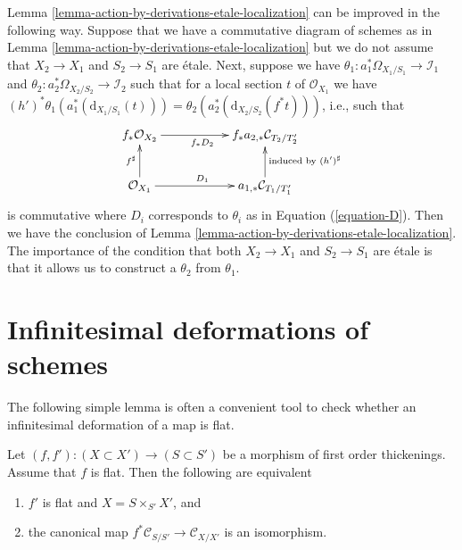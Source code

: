 \begin{remark}
\label{remark-tiny-improvement}
Lemma \ref{lemma-action-by-derivations-etale-localization}
can be improved in the following way.
Suppose that we have a commutative diagram of schemes as in
Lemma \ref{lemma-action-by-derivations-etale-localization}
but we do not assume that $X_2 \to X_1$
and $S_2 \to S_1$ are \'etale. Next, suppose we have
$\theta_1 : a_1^*\Omega_{X_1/S_1} \to \mathcal{I}_1$
and
$\theta_2 : a_2^*\Omega_{X_2/S_2} \to \mathcal{I}_2$
such that for a local section $t$ of $\mathcal{O}_{X_1}$ we have
$(h')^*\theta_1(a_1^*(\text{d}_{X_1/S_1}(t))) =
\theta_2(a_2^*(\text{d}_{X_2/S_2}(f^*t)))$, i.e., such that
$$
\xymatrix{
f_*\mathcal{O}_{X_2} \ar[rr]_{f_*D_2} & &
f_*a_{2, *}\mathcal{C}_{T_2/T_2'} \\
\mathcal{O}_{X_1} \ar[rr]^{D_1} \ar[u]^{f^\sharp} & &
a_{1, *}\mathcal{C}_{T_1/T_1'} \ar[u]_{\text{induced by }(h')^\sharp}
}
$$
is commutative where $D_i$ corresponds to $\theta_i$ as in
Equation (\ref{equation-D}). Then we have the conclusion of
Lemma \ref{lemma-action-by-derivations-etale-localization}.
The importance of the condition that both $X_2 \to X_1$ and
$S_2 \to S_1$ are \'etale is that it allows us to construct a $\theta_2$
from $\theta_1$.
\end{remark}






\section{Infinitesimal deformations of schemes}
\label{section-deform}

\noindent
The following simple lemma is often a convenient tool to check whether
an infinitesimal deformation of a map is flat.

\begin{lemma}
\label{lemma-deform}
Let $(f, f') : (X \subset X') \to (S \subset S')$ be a morphism
of first order thickenings. Assume that $f$ is flat.
Then the following are equivalent
\begin{enumerate}
\item $f'$ is flat and $X = S \times_{S'} X'$, and
\item the canonical map $f^*\mathcal{C}_{S/S'} \to \mathcal{C}_{X/X'}$
is an isomorphism.
\end{enumerate}
\end{lemma}

